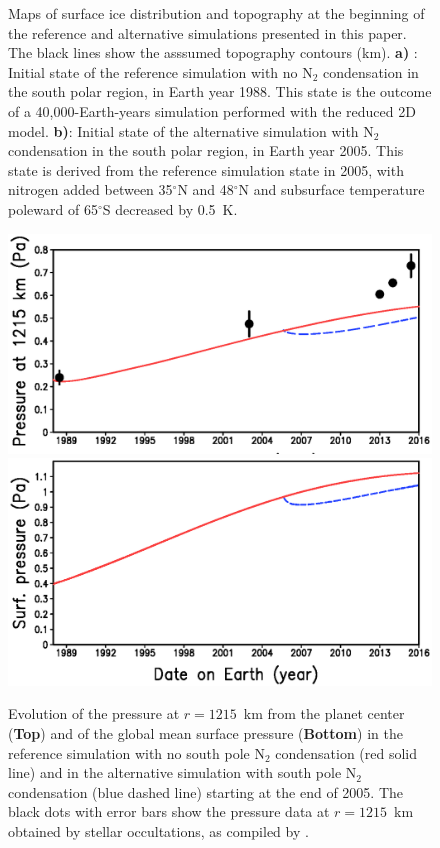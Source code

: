 \begin{figure}
\begin{center}
    \caption{
\label{fg:map_ini}
Maps of surface ice distribution and topography at the beginning of the reference and alternative
simulations presented in this paper. 
The black lines show the asssumed topography contours (km). 
{\bf a) }: Initial state of the reference
simulation with no N$_2$ condensation in the south polar region, in Earth year 1988. This state is
the outcome of a 40,000-Earth-years simulation performed with the reduced 2D model.
{\bf b)}: Initial state of the alternative simulation 
with N$_2$ condensation in the south polar region, in
Earth year 2005. This state is derived from the reference simulation state in 2005, with nitrogen
added between 35$^\circ$N and 48$^\circ$N and subsurface temperature poleward of 65$^\circ$S
decreased by 0.5~K. 
}
  \end{center}
\end{figure}
\begin{figure}
  \begin{center}
   \includegraphics[width=12.cm,angle=-0,clip]{figures/evol_p1215km.eps} \\
   \includegraphics[width=12.cm,angle=-0,clip]{figures/evol_ps.eps} \\
    \caption{
Evolution of the pressure at $r=1215$~km from the planet center 
({\bf Top}) 
and of the global mean surface pressure 
({\bf Bottom}) 
in the reference simulation with 
no south pole N$_2$ condensation (red solid line) and in the alternative simulation with south pole
N$_2$ condensation (blue dashed line) starting at the end of 2005. The black dots with error bars show the
pressure data at  $r=1215$~km obtained by stellar occultations, as compiled by \cite{Sica:16}.
\label{fg:evol_ps}
}
  \end{center}
\end{figure}


